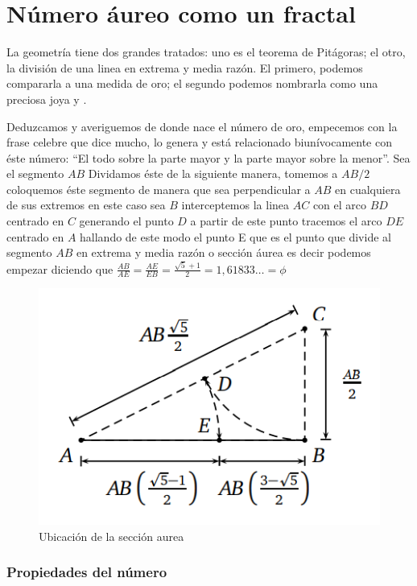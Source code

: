 \documentclass[
  11pt,
]{krantz}
\theoremstyle{definition}
\theoremstyle{definition}
\theoremstyle{definition}
\theoremstyle{definition}
\theoremstyle{remark}
\begin{document}
\hypertarget{nuxfamero-uxe1ureo-como-un-fractal}{%
\chapter{Número áureo como un fractal}\label{nuxfamero-uxe1ureo-como-un-fractal}}

La geometría tiene dos grandes tratados: uno es el teorema de Pitágoras; el otro, la división de una linea en extrema y media razón. El primero, podemos compararla a una medida de oro; el segundo podemos nombrarla como una preciosa joya \citet{Ghy77}
y \citet{ghyka1977geometry}.

Deduzcamos y averiguemos de donde nace el número de oro, empecemos con la frase celebre que dice mucho, lo genera y está relacionado biunívocamente con éste número: ``El todo sobre la parte mayor y la parte mayor sobre la menor''. Sea el segmento \(AB\) Dividamos éste de la siguiente manera,
tomemos a \(AB/2\) coloquemos éste segmento de manera que sea perpendicular
a \(AB\) en cualquiera de sus extremos en este caso sea \(B\) interceptemos la linea
\(AC\) con el arco \(BD\) centrado en \(C\) generando el punto \(D\) a partir de este punto
tracemos el arco \(DE\) centrado en \(A\) hallando de este modo el punto E que es
el punto que divide al segmento \(AB\) en extrema y media razón o sección áurea
es decir podemos empezar diciendo que \(\frac{AB}{AE}=\frac{AE}{EB}=\frac{\sqrt{5}+1}{2}= 1,61833\ldots = \phi\)

\begin{figure}[!ht]

{\centering \includegraphics[width=0.5\linewidth]{book1} 

}

\caption{Ubicación de la sección aurea}\label{fig:aureo1}
\end{figure}

\hypertarget{propiedades-del-nuxfamero}{%
\subsection{Propiedades del número}\label{propiedades-del-nuxfamero}}
\end{document}
